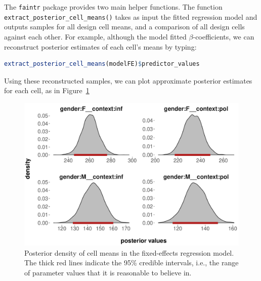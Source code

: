 \documentclass[nobib]{tufte-handout}
\begin{document}
The \texttt{faintr} package provides two main helper functions.
%
%
The function \texttt{extract\_posterior\_cell\_means()}
takes as input the fitted regression model and outputs samples for all design cell means, and a comparison of all design
cells against each other. For example, although the model fitted $\beta$-coefficients, we can reconstruct posterior estimates of each cell's means by typing:

\begin{minipage}[]{1.3\textwidth}
\begin{lstlisting}[language=R]
extract_posterior_cell_means(modelFE)$predictor_values
\end{lstlisting}
\end{minipage}

\vspace*{-0.5cm}

\noindent Using these reconstructed samples, we can plot approximate posterior estimates for each cell, as in Figure~\ref{fig:Posteriors_cell_means}

\begin{figure}
  \centering
  \includegraphics[width=\textwidth]{pics/posterior_density_cell_means.pdf}
  \caption[Posteriors over cell means in fixed-effects model]{Posterior density of cell means
    in the fixed-effects regression model. The thick red lines indicate the 95\% credible
    intervals, i.e., the range of parameter values that it is reasonable to believe in.}
  \label{fig:Posteriors_cell_means}
\end{figure}
\end{document}
